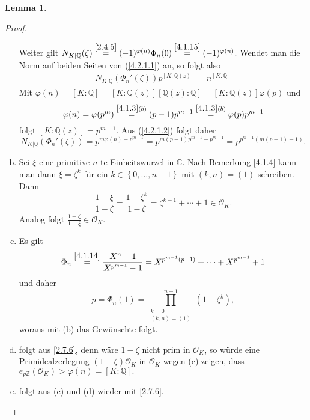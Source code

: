 \documentclass[
twoside=semi,
fontsize=12,
DIV=12, 
cleardoublepage=current,
leqno,
headings=optiontoheadandtoc, 
toc=idx
]{scrbook}
\newcommand{\Z}{\mathbb{Z}}
\newcommand{\Q}{\mathbb{Q}}
\newcommand{\C}{\mathbb{C}}
\newcommand{\set}[1]{\left\{ #1 \right\}}
\theoremstyle{definition}
\newtheorem{lemma}[definition]{Lemma}
\begin{document}
\begin{lemma}
\begin{proof}
\begin{enumerate}[(a)]
 				\noindent Weiter gilt $N_{K|\Q}(\zeta) \overset{\ref{2.4.5}}{=} (-1)^{\varphi(n)}\Phi_n(0) \overset{\ref{4.1.15}}{=} (-1)^{\varphi(n)}$. Wendet man die Norm auf beiden Seiten von (\ref{4.2.1.1}) an, so folgt also
 				\begin{align*}
 					N_{K|\Q}(\Phi_n'(\zeta))p^{[K:\Q(z)]} = n^{[K:\Q]} \label{4.2.1.2}\tag{$**$}
 				\end{align*}
 				Mit $\varphi(n) = [K:\Q] = [K:\Q(z)][\Q(z):\Q] = [K:\Q(z)]\varphi(p)$ und
 					\[\varphi(n) = \varphi(p^m) \overset{\ref{4.1.3}(b)}{=} (p-1)p^{m-1} \overset{\ref{4.1.3}(b)}{=} \varphi(p)p^{m-1}\]
 				folgt $[K:\Q(z)] = p^{m-1}$. Aus (\ref{4.2.1.2}) folgt daher
 					\[N_{K|\Q}(\Phi_n'(\zeta)) = p^{m\varphi(n) -p^{m-1}} = p^{m(p-1)p^{m-1} - p^{m-1}} = p^{p^{m-1} (m(p-1)-1)}.\]
 				
 				\item Sei $\xi$ eine primitive $n$-te Einheitswurzel in $\C$. Nach Bemerkung \ref{4.1.4} kann man dann $\xi = \zeta^k$ f\"ur ein $k \in \set{0, \dots, n-1}$ mit
 				$(k, n) = (1)$ schreiben. Dann
 					\[\frac{1-\xi}{1-\zeta} = \frac{1-\zeta^k}{1-\zeta} = \zeta^{k-1} + \cdots + 1 \in \mathcal{O}_K.\]
 				Analog folgt $\frac{1-\zeta}{1-\xi} \in \mathcal{O}_K.$
 				
 				\item Es gilt 
 					\[\Phi_n \overset{\ref{4.1.14}}{=} \frac{X^n-1}{X^{p^{m-1}} - 1} = X^{p^{m-1}(p-1)} + \cdots + X^{p^{m-1}}+ 1\]
 				und daher 
 					\[p = \Phi_n(1) = \prod_{\substack{k=0\\(k,n)=(1)}}^{n-1} (1-\zeta^k),\]
 				woraus mit (b) das Gew\"unschte folgt.
 				
 				\item folgt aus \ref{2.7.6}, denn w\"are $1-\zeta$ nicht prim in $\mathcal{O}_K$, so w\"urde eine Primidealzerlegung $(1-\zeta)\mathcal{O}_K$ in $\mathcal{O}_K$ wegen
 				(c) zeigen, dass $e_{p\Z}(\mathcal{O}_K) > \varphi(n) = [K:\Q].$
 				
 				\item folgt aus (c) und (d) wieder mit \ref{2.7.6}.
 			\end{enumerate}
 		\end{proof}
 	\end{lemma}
 	
\end{document}
